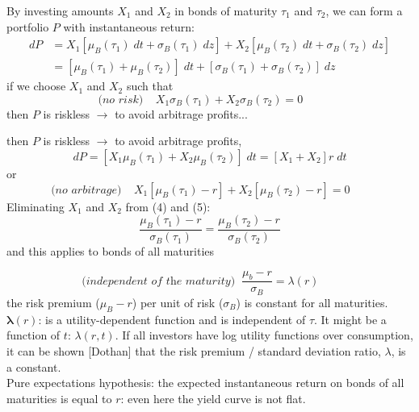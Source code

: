 \documentclass[
14pt,notheorems,hyperref={pdfauthor=whatever}
]{beamer}
\begin{document}
\begin{frame}
By investing amounts $X_1$ and $X_2$ in bonds of maturity $\tau_1$ and $\tau_2$, we can form a portfolio $P$ with instantaneous return:
\begin{align*}
    dP &= X_1[\mu_B(\tau_1)\;dt+\sigma_B(\tau_1)\;dz]+X_2[\mu_B(\tau_2)\;dt+\sigma_B(\tau_2)\;dz]\\
    &= [\mu_B(\tau_1)+\mu_B(\tau_2)]\;dt+[\sigma_B(\tau_1)+\sigma_B(\tau_2)]\;dz
\end{align*}
if we choose $X_1$ and $X_2$ such that
\begin{equation} \tag{4}
    \textit{(no risk)} \;\;\;\; X_1\sigma_B(\tau_1)+X_2\sigma_B(\tau_2) = 0 \;\;\;\;\;\;
\end{equation}
then $P$ is riskless $\longrightarrow$ to avoid arbitrage profits...
\end{frame}

\begin{frame}
then $P$ is riskless $\longrightarrow$ to avoid arbitrage profits,
\[ dP = [X_1 \mu_B(\tau_1)+X_2 \mu_B(\tau_2)]\;dt = [X_1+X_2]r\;dt \]
or
\begin{equation} \tag{5}
    \textit{(no arbitrage)} \;\;\;\; X_1[\mu_B(\tau_1)-r]+X_2[\mu_B(\tau_2)-r] = 0 \;\;\;\;\;\;
\end{equation}
\hfill\break
Eliminating $X_1$ and $X_2$ from (4) and (5):
\[ \frac{\mu_B(\tau_1)-r}{\sigma_B(\tau_1)} = \frac{\mu_B(\tau_2)-r}{\sigma_B(\tau_2)}\]
and this applies to bonds of all maturities
\end{frame}

\begin{frame}
\begin{equation} \tag{6}
    \textit{(independent of the maturity)} \;\; \frac{\mu_b - r}{\sigma_B} = \lambda(r) \;\;\;\;\;\;
\end{equation}
the risk premium ($\mu_B - r$) per unit of risk ($\sigma_B$) is constant for all maturities.\\
\hfill\break
$\bm{\lambda}(r)$: is a utility-dependent function and is independent of $\tau$. It might be a function of $t$: $\lambda(r,t)$. If all investors have log utility functions over consumption, it can be shown [Dothan] that the risk premium / standard deviation ratio, $\lambda$, is a constant.\\
\hfill\break
Pure expectations hypothesis: the expected instantaneous return on bonds of all maturities is equal to $r$: even here the yield curve is not flat.\\
\end{frame}
\end{document}
